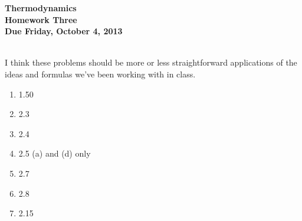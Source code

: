 \documentclass[12pt]{article}
\begin{document}
\pagestyle{empty}
 
\begin{center}
{\large {\bf Thermodynamics}}\\
\medskip
{\large {\bf Homework Three}}\\
\medskip
{ {\bf Due Friday, October 4, 2013}}\\
\end{center}

\hspace{2mm}\\
\noindent  I think these problems should be more or less
straightforward applications of the ideas and formulas we've been
working with in class.  

\begin{enumerate}
\setlength{\itemsep}{1mm}
  \item 1.50
  \item 2.3
  \item 2.4
  \item 2.5 (a) and (d) only
  \item 2.7
  \item 2.8
  \item 2.15
\end{enumerate}
\end{document}
